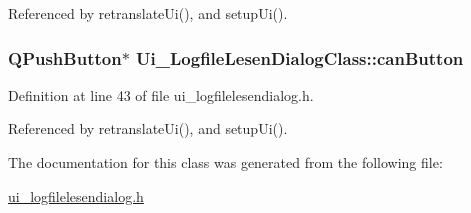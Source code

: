 Referenced by retranslateUi(), and setupUi().\hypertarget{class_ui___logfile_lesen_dialog_class_f9ffc044295598b1ba015b0256eaf072}{
\subsubsection[canButton]{\setlength{\rightskip}{0pt plus 5cm}QPushButton$\ast$ {\bf Ui\_\-LogfileLesenDialogClass::canButton}}}
\label{class_ui___logfile_lesen_dialog_class_f9ffc044295598b1ba015b0256eaf072}




Definition at line 43 of file ui\_\-logfilelesendialog.h.

Referenced by retranslateUi(), and setupUi().

The documentation for this class was generated from the following file:\begin{CompactItemize}
\item 
\hyperlink{ui__logfilelesendialog_8h}{ui\_\-logfilelesendialog.h}\end{CompactItemize}
